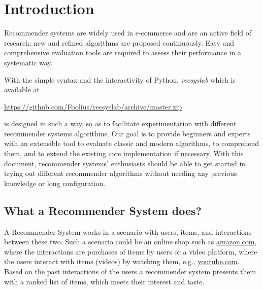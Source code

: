 \chapter{Introduction}
Recommender systems are widely used in e-commerce and are an active field of research; new and refined algorithms are proposed continuously. Easy and comprehensive evaluation tools are required to assess their performance in a systematic way.  

With the simple syntax and the interactivity
of Python, \textit{recsyslab} which is available at

\vspace{2mm}
\centerline{\url{https://github.com/Foolius/recsyslab/archive/master.zip}}
\vspace{2mm}is designed in such a way, so as to facilitate experimentation with different recommender systems
algorithms. Our goal is to provide beginners and experts with an extensible tool to evaluate classic and modern algorithms, to comprehend them, and to extend the existing core implementation if necessary. With this document, recommender systems' enthusiasts should be able to get started in trying out different recommender algorithms
without needing any previous knowledge or long configuration.


\section{What a Recommender System does?}
A Recommender System works in a scenario with users, items, and interactions
between these two. Such a scenario could be an online shop such as \url{amazon.com},
where the interactions are purchases of items by users or a video
platform, where the users interact with items (videos) by watching
them, e.g., \url{youtube.com}. Based on the past interactions of the users
a recommender system presents them with a ranked list of items, which meets their interest and taste.

